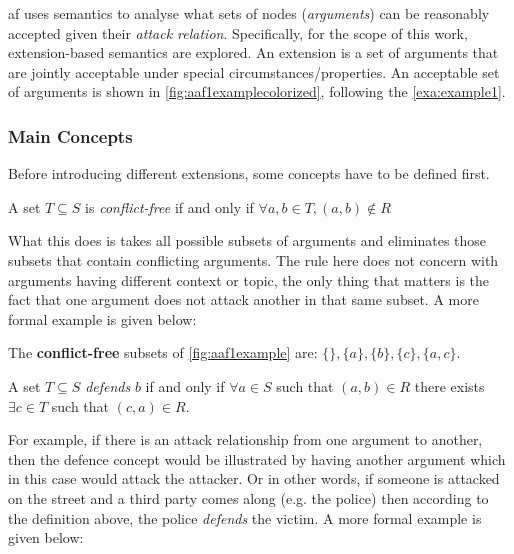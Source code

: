         \gls{af} uses semantics to analyse what sets of nodes (\textit{arguments}) can be reasonably accepted given their \textit{attack relation}. Specifically, for the scope of this work, extension-based semantics are explored. An extension is a set of arguments that are jointly acceptable under special circumstances/properties. An acceptable set of arguments is shown in \autoref{fig:aaf1examplecolorized}, following the \cref{exa:example1}.
        
        
        \subsubsection{Main Concepts}
            Before introducing different extensions, some concepts have to be defined first.
            \begin{definition}
                A set $T \subseteq S$ is \textit{conflict-free} if and only if $ \forall a, b \in T, (a, b) \notin R$
                \label{definition:definition2}
            \end{definition}
            
            What this does is takes all possible subsets of arguments and eliminates those subsets that contain conflicting arguments. The rule here does not concern with arguments having different context or topic, the only thing that matters is the fact that one argument does not attack another in that same subset. A more formal example is given below:
            
            \begin{exa}
                The \textbf{conflict-free} subsets of \autoref{fig:aaf1example} are: $\{\}, \{a\}, \{b\}, \{c\}, \{a, c\}$.
                \label{exa:example2}
            \end{exa}
            
            \begin{definition}
                A set $T \subseteq S$ \textit{defends} $b$ if and only if $ \forall a \in S$ such that $(a, b) \in R$ there exists $\exists c \in T$ such that $(c, a) \in R$.
                \label{definition:definition3}
            \end{definition}
            
            For example, if there is an attack relationship from one argument to another, then the defence concept would be illustrated by having another argument which in this case would attack the attacker. Or in other words, if someone is attacked on the street and a third party comes along (e.g. the police) then according to the definition above, the police \textit{defends} the victim. A more formal example is given below:
            
